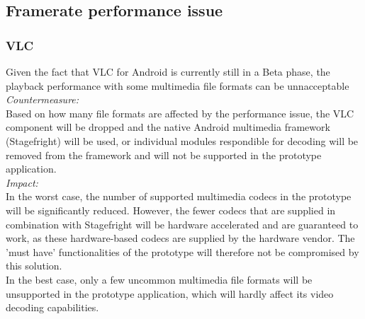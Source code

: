 \subsection{Framerate performance issue}
\subsubsection{VLC}
Given the fact that VLC for Android is currently still in a Beta phase, the playback performance with some multimedia file formats can be unnacceptable\\
\newline
\textit{Countermeasure:}\\
Based on how many file formats are affected by the performance issue, the VLC component will be dropped and the native Android multimedia framework (Stagefright) will be used, or individual modules respondible for decoding will be removed from the framework and will not be supported in the prototype application.\\
\newline
\textit{Impact:}\\
In the worst case, the number of supported multimedia codecs in the prototype will be significantly reduced. However, the fewer codecs that are supplied in combination with Stagefright will be hardware accelerated and are guaranteed to work, as these hardware-based codecs are supplied by the hardware vendor. The 'must have' functionalities of the prototype will therefore not be compromised by this solution.\\
\newline
In the best case, only a few uncommon multimedia file formats will be unsupported in the prototype application, which will hardly affect its video decoding capabilities.





